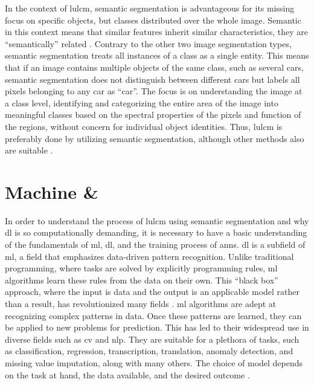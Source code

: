 In the context of \gls{lulcm}, semantic segmentation is advantageous for its missing focus on specific objects, but classes distributed over the whole image. Semantic in this context means that similar features inherit similar characteristics, they are \enquote{semantically} related \autocite{Shanmugamani2018}. Contrary to the other two image segmentation types, semantic segmentation treats all instances of a class as a single entity. This means that if an image contains multiple objects of the same class, such as several cars, semantic segmentation does not distinguish between different cars but labels all pixels belonging to any car as \enquote{car}. The focus is on understanding the image at a class level, identifying and categorizing the entire area of the image into meaningful classes based on the spectral properties of the pixels and function of the regions, without concern for individual object identities. Thus, \gls{lulcm} is preferably done by utilizing semantic segmentation, although other methods also are suitable \autocite{Li.Cai.ea2024,Minaee.Boykov.ea2022,Shanmugamani2018,Szeliski2022}.

\section{Machine \& }

In order to understand the process of \gls{lulcm} using semantic segmentation and why \gls{dl} is so computationally demanding, it is necessary to have a basic understanding of the fundamentals of \gls{ml}, \gls{dl}, and the training process of \glspl{ann}. \gls{dl} is a subfield of \gls{ml}, a field that emphasizes data-driven pattern recognition. Unlike traditional programming, where tasks are solved by explicitly programming rules, \gls{ml} algorithms learn these rules from the data on their own. This \enquote{black box} approach, where the input is data and the output is an applicable model rather than a result, has revolutionized many fields \autocite{Bernard2021,Sarker2021,Shinde.Shah2018}. \gls{ml} algorithms are adept at recognizing complex patterns in data. Once these patterns are learned, they can be applied to new problems for prediction. This has led to their widespread use in diverse fields such as \gls{cv} and \gls{nlp}. They are suitable for a plethora of tasks, such as classification, regression, transcription, translation, anomaly detection, and missing value imputation, along with many others. The choice of model depends on the task at hand, the data available, and the desired outcome \autocite{Goodfellow.Bengio.ea2016}.

